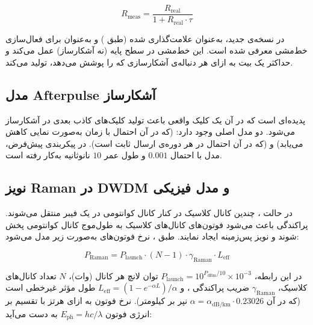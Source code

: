 \begin{equation}
	R_{\text{meas}} = \frac{R_{\text{real}}}{1 + R_{\text{real}} \cdot \tau}
\end{equation}

در نسخه‌ی جدید،  به‌عنوان  علامت‌گذاری شده (طبق ) و  به‌عنوان  برای فعال‌سازی خط‌مشی  معرفی شده است. این خط‌مشی در سطح پایه (نه آشکارساز) عمل می‌کند و حداکثر یک بیت  به ازای هر دنباله‌ی آشکارسازی که  را پوشش می‌دهد، تولید می‌کند.

\subsection{مدل Afterpulse آشکارساز}

 پدیده‌ای است که در آن یک کلیک واقعی باعث تولید کلیک‌های کاذب بعدی در آشکارساز می‌شود. دو مدل اصلی وجود دارد:  (که در آن احتمال  با زمان به‌صورت نمایی کاهش می‌یابد) و  (که در آن احتمال در هر دوره‌ی ارسال ثابت است). در پیکربندی پیش‌فرض، مدل  با احتمال $0.001$ و طول عمر $10$ نانوثانیه به‌کار رفته است.

\subsection{نویز Raman در DWDM و مدل فیزیکی}

در حالت ، چندین کانال کلاسیک در کنار کانال کوانتومی در یک فیبر منتقل می‌شوند. پراکندگی  باعث می‌شود فوتون‌های کانال‌های کلاسیک به طول‌موج کانال کوانتومی پخش شوند و نویز پس‌زمینه ایجاد نمایند. طبق ، نرخ فوتون‌های  به‌صورت زیر مدل می‌شود:

\begin{equation}
	P_{\text{Raman}} = P_{\text{launch}} \cdot (N - 1) \cdot \gamma_{\text{Raman}} \cdot L_{\text{eff}}
\end{equation}

در این رابطه، $P_{\text{launch}} = 10^{P_{\text{dBm}}/10} \times 10^{-3}$ توان لانچ هر کانال (وات)، $N$ تعداد کانال‌های کلاسیک، $\gamma_{\text{Raman}}$ ضریب پراکندگی ، و $L_{\text{eff}} = (1 - e^{-\alpha L}) / \alpha$ طول مؤثر غیرخطی است (که در آن $\alpha = \alpha_{\text{dB/km}} \cdot 0.23026$ نپر بر کیلومتر). نرخ فوتون به ازای هرتز با تقسیم بر انرژی فوتون $E_{\text{ph}} = hc/\lambda$ به دست می‌آید:

